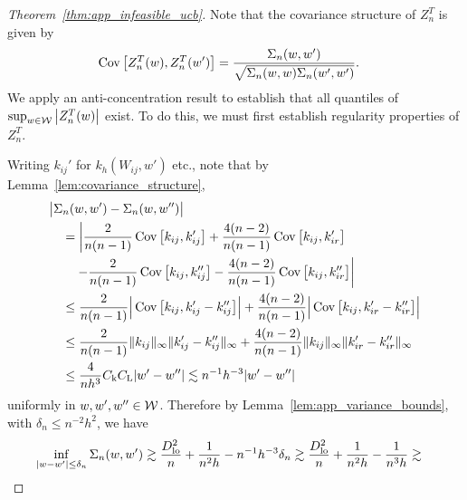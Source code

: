 \begin{proof}[Theorem~\ref{thm:app_infeasible_ucb}]

  Note that the covariance structure of $Z_n^T$ is given by
  \begin{align*}
    \operatorname{Cov}\big[
      Z_n^T(w),
      Z_n^T(w')
      \big]
    &=
    \frac{\Sigma_n(w,w')}
    {\sqrt{\Sigma_n(w,w) \Sigma_n(w',w')}}.
  \end{align*}
  We apply an anti-concentration result
  to establish that all quantiles of
  $\sup_{w \in \mathcal{W}} \big|Z_n^T(w)\big|$ exist.
  To do this, we must first establish regularity
  properties of $Z_n^T$.


  Writing $k_{ij}'$
  for $k_h(W_{ij},w')$ etc.,
  note that by Lemma~\ref{lem:covariance_structure},
  \begin{align*}
    &\big|
    \Sigma_n(w,w')
    -
    \Sigma_n(w, w'')
    \big| \\
    &\quad=
    \left|
    \frac{2}{n(n-1)}
    \operatorname{Cov}\big[
      k_{ij},
      k_{ij}'
      \big]
    +
    \frac{4(n-2)}{n(n-1)}
    \operatorname{Cov}\big[
      k_{ij},
      k_{ir}'
      \big]
      \right. \\
    &\left.
    \qquad-
    \frac{2}{n(n-1)}
    \operatorname{Cov}\big[
      k_{ij},
      k_{ij}''
      \big]
    -
    \frac{4(n-2)}{n(n-1)}
    \operatorname{Cov}\big[
      k_{ij},
      k_{ir}''
      \big]
    \right| \\
    &\quad\leq
    \frac{2}{n(n-1)}
    \Big|
    \operatorname{Cov}\big[
      k_{ij},
      k_{ij}' - k_{ij}''
      \big]
    \Big|
    +
    \frac{4(n-2)}{n(n-1)}
    \Big|
    \operatorname{Cov}\big[
      k_{ij},
      k_{ir}' - k_{ir}''
      \big]
    \Big| \\
    &\quad\leq
    \frac{2}{n(n-1)}
    \|k_{ij}\|_\infty
    \|k_{ij}' - k_{ij}''\|_\infty
    +
    \frac{4(n-2)}{n(n-1)}
    \|k_{ij}\|_\infty
    \|k_{ir}' - k_{ir}''\|_\infty \\
    &\quad\leq
    \frac{4}{nh^3}
    C_\mathrm{k} C_\mathrm{L}
    |w'-w''|
    \lesssim
    n^{-1}h^{-3} |w'-w''|
  \end{align*}
  uniformly in $w, w', w'' \in \mathcal{W}$.
  Therefore by Lemma~\ref{lem:app_variance_bounds},
  with $\delta_n \leq n^{-2} h^2$,
  we have
  \begin{align*}
    \inf_{|w-w'| \leq \delta_n}
    \Sigma_n(w,w')
    &\gtrsim
    \frac{\Dl^2}{n}
    + \frac{1}{n^2h}
    - n^{-1} h^{-3} \delta_n
    \gtrsim
    \frac{\Dl^2}{n}
    + \frac{1}{n^2h}
    - \frac{1}{n^3h}
    \gtrsim

\end{align*}
\end{proof}
